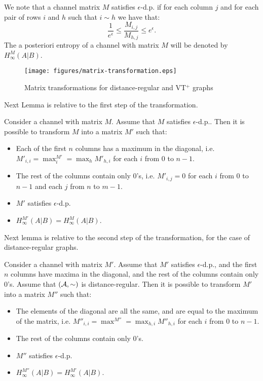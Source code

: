 \documentclass{llncs}
\begin{document}
We note that a channel matrix $M$ satisfies $\epsilon$-d.p.  if for each column $j$ and for each pair of rows $i$ and $h$ such that $i\sim h$ we have that:
\[
\frac{1}{e^\epsilon}\leq \frac{M_{i,j}}{M_{h,j}}\leq e^\epsilon.
\]
The a posteriori entropy of a channel with matrix $M$ will be denoted by $H^M_\infty(A|B)$. 

\begin{figure}[t]\centering
		\texttt{[image: figures/matrix-transformation.eps]}\caption{Matrix transformations for distance-regular and VT$^+$ graphs}\label{fig:mat-transf}\end{figure}

Next Lemma is relative to the first step of the transformation. 
\begin{lemma}\label{lem:transform-diagonal}
Consider a channel with matrix $M$. Assume that $M$ satisfies $\epsilon$-d.p.. Then it is possible to transform $M$ into a matrix $M'$ such that: 
\begin{itemize}
\item Each of the first $n$ columns has a maximum in the diagonal, i.e. $M'_{i,i}=  \max^{M'}_{i} = \max_h M'_{h,i}$ for each $i$ from $0$ to $n-1$. 
\item The rest of the columns contain only $0$'s, i.e. $M'_{i,j}= 0$ for each $i$ from $0$ to $n-1$ and each $j$ from $n$ to $m-1$.
\item $M'$ satisfies $\epsilon$-d.p.
\item $H^{M'}_\infty(A|B) = H^{M}_\infty(A|B)$. 
\end{itemize}
\end{lemma}

Next lemma is relative to the second step of the transformation, for the case of distance-regular graphs. 

\begin{lemma}\label{lem:transform-dr}
Consider a channel with matrix $M'$. Assume that $M'$ satisfies $\epsilon$-d.p., and the first $n$ columns have  maxima   in the diagonal,  and the rest of the columns contain only $0$'s. Assume that $({\cal A}, \sim)$ is distance-regular. Then it is possible to transform $M'$ into a matrix $M''$ such that: 
\begin{itemize}
\item The elements of the diagonal are all the same, and are equal to the maximum of the matrix, i.e. $M''_{i,i}= \max^{M''}=\max_{h,i} M''_{h,i}$ for each $i$ from $0$ to $n-1$. 
\item The rest of the columns contain only $0$'s.
\item $M''$ satisfies $\epsilon$-d.p.
\item $H^{M''}_\infty(A|B) = H^{M'}_\infty(A|B)$. 
\end{itemize}
\end{lemma}
\end{document}
